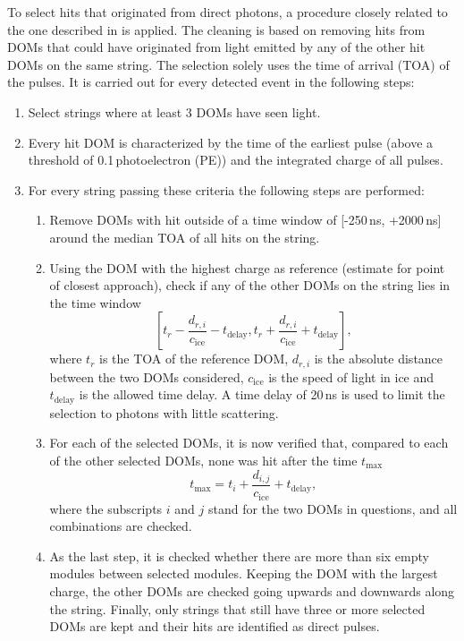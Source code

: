 To select hits that originated from direct photons, a procedure closely related to the one described in  is applied.
The cleaning is based on removing hits from DOMs that could have originated from light emitted by any of the other hit DOMs on the same string.
The selection solely uses the time of arrival (TOA) of the pulses. It is carried out for every detected event in the following steps:

\begin{enumerate}[label=(\roman*)]
    \item Select strings where at least 3 DOMs have seen light.
    \item Every hit DOM is characterized by the time of the earliest pulse (above a threshold of 0.1\,photoelectron (PE)) and the integrated charge of all pulses.
    \item For every string passing these criteria the following steps are performed:
    \begin{enumerate}[label=(\alph*)]
        \item Remove DOMs with hit outside of a time window of [-250\,ns, +2000\,ns] around the median TOA of all hits on the string.
        \item Using the DOM with the highest charge as reference (estimate for point of closest approach), check if any of the other DOMs on the string lies in the time window
        \begin{equation}
            \left [ t_r - \frac{d_{r,i}}{c_\mathrm{ice}} - t_\mathrm{delay}, t_r + \frac{d_{r,i}}{c_\mathrm{ice}} + t_\mathrm{delay} \right ],
        \end{equation}
        where $t_r$ is the TOA of the reference DOM, $d_{r,i}$ is the absolute distance between the two DOMs considered, $c_\mathrm{ice}$ is the speed of light in ice and $t_\mathrm{delay}$ is the allowed time delay.
        A time delay of 20\,ns is used to limit the selection to photons with little scattering.
        \item For each of the selected DOMs, it is now verified that, compared to each of the other selected DOMs, none was hit after the time $t_\mathrm{max}$
        \begin{equation}
            t_\mathrm{max} = t_i + \frac{d_{i,j}}{c_\mathrm{ice}} + t_\mathrm{delay},
        \end{equation}
        where the subscripts $i$ and $j$ stand for the two DOMs in questions, and all combinations are checked.
        \item As the last step, it is checked whether there are more than six empty modules between selected modules.
        Keeping the DOM with the largest charge, the other DOMs are checked going upwards and downwards along the string.
        Finally, only strings that still have three or more selected DOMs are kept and their hits are identified as direct pulses.
    \end{enumerate}
\end{enumerate}


